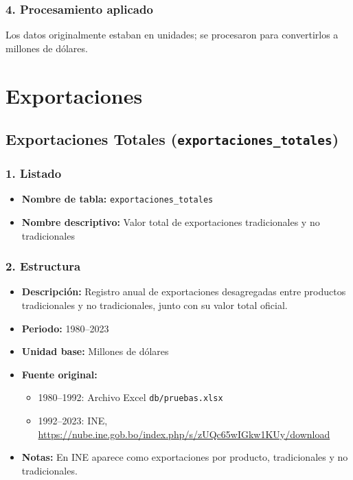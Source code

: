 \documentclass[12pt,a4paper]{article}
\begin{document}
\subsubsection*{4. Procesamiento aplicado}
Los datos originalmente estaban en unidades; se procesaron para convertirlos a millones de dólares.

\newpage
\section{Exportaciones}
\subsection{Exportaciones Totales (\texttt{exportaciones\_totales})}

\subsubsection*{1. Listado}
\begin{itemize}
  \item \textbf{Nombre de tabla:} \texttt{exportaciones\_totales}
  \item \textbf{Nombre descriptivo:} Valor total de exportaciones tradicionales y no tradicionales
\end{itemize}

\subsubsection*{2. Estructura}
\begin{itemize}
  \item \textbf{Descripción:} Registro anual de exportaciones desagregadas entre productos tradicionales y no tradicionales, junto con su valor total oficial.
  \item \textbf{Periodo:} 1980--2023
  \item \textbf{Unidad base:} Millones de dólares
  \item \textbf{Fuente original:}
    \begin{itemize}
      \item 1980--1992: Archivo Excel \texttt{db/pruebas.xlsx}
      \item 1992--2023: INE, \url{https://nube.ine.gob.bo/index.php/s/zUQc65wIGkw1KUy/download}
    \end{itemize}
  \item \textbf{Notas:} En INE aparece como exportaciones por producto, tradicionales y no tradicionales.
\end{itemize}
\end{document}
